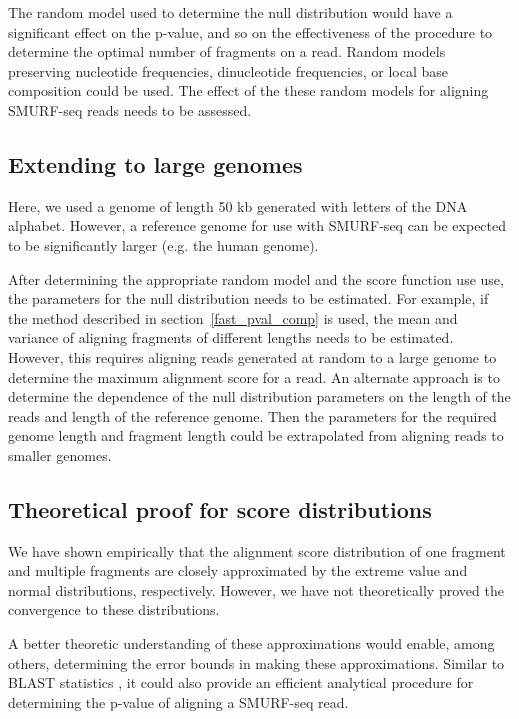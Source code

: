 The random model used to determine the null distribution would have a
significant effect on the p-value, and so on the effectiveness of the
procedure to determine the optimal number of fragments on a read. Random
models preserving nucleotide frequencies, dinucleotide frequencies, or
local base composition could be used.  The effect of the these random
models for aligning SMURF-seq reads needs to be assessed.

\subsection*{Extending to large genomes}
Here, we used a genome of length 50 kb generated with letters of the DNA
alphabet. However, a reference genome for use with SMURF-seq can be
expected to be significantly larger (e.g. the human genome).

After determining the appropriate random model and the score function
use use, the parameters for the null distribution needs to be estimated.
For example, if the method described in section~\ref{fast_pval_comp} is
used, the mean and variance of aligning fragments of different lengths
needs to be estimated.
%
However, this requires aligning reads generated at random to a large
genome to determine the maximum alignment score for a read.
%
An alternate approach is to determine the dependence of the null
distribution parameters on the length of the reads and length of the
reference genome. Then the parameters for the required genome length and
fragment length could be extrapolated from aligning reads to smaller
genomes.

\subsection*{Theoretical proof for score distributions}
We have shown empirically that the alignment score distribution of one
fragment and multiple fragments are closely approximated by the extreme
value and normal distributions, respectively. However, we have not
theoretically proved the convergence to these distributions.

A better theoretic understanding of these approximations would enable,
among others, determining the error bounds in making these
approximations.
%
Similar to BLAST statistics
\citep{karlin1990methods,karlin1990statistical}, it could also provide
an efficient analytical procedure for determining the p-value of
aligning a SMURF-seq read.

